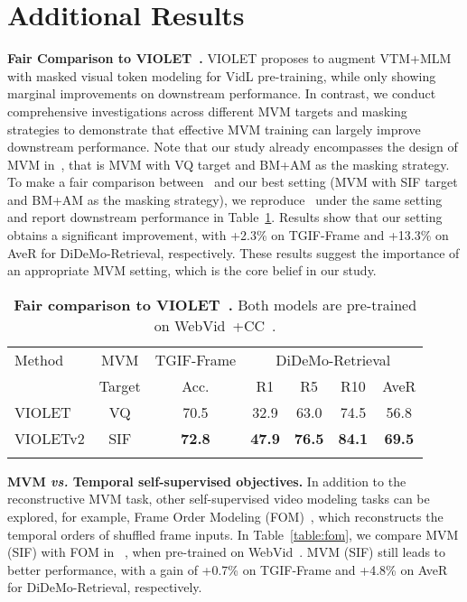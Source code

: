 \documentclass[10pt,twocolumn,letterpaper]{article}
\newlength\savewidth
\newcommand\shline{\noalign{\global\savewidth\arrayrulewidth\global\arrayrulewidth 1pt}\hline\noalign{\global\arrayrulewidth\savewidth}}
\newcommand{\tablestyle}[2]{\setlength{\tabcolsep}{#1}\renewcommand{\arraystretch}{#2}\centering\footnotesize}
\newcommand{\modelorig}{VIOLET\xspace}
\begin{document}
\section{Additional Results}
\noindent \textbf{Fair Comparison to \modelorig~\cite{fu2021violet}.} 
\modelorig proposes to augment VTM+MLM with masked visual token modeling for VidL pre-training, while only showing marginal improvements on downstream performance. In contrast, we conduct comprehensive investigations across different MVM targets and masking strategies to demonstrate that effective MVM training can largely improve downstream performance. Note that our study already encompasses the design of MVM in~\cite{fu2021violet}, that is MVM with VQ target and BM+AM as the masking strategy. To make a fair comparison between~\cite{fu2021violet} and our best setting (MVM with SIF target and BM+AM as the masking strategy), we reproduce~\cite{fu2021violet} under the same setting and report downstream performance in Table~\ref{table:violet-v1-v2}. Results show that our setting obtains a significant improvement, with +2.3\% on TGIF-Frame and +13.3\% on AveR for DiDeMo-Retrieval, respectively. These results suggest the importance of an appropriate MVM setting, which is the core belief in our study.
\vspace{-2ex}
\begin{table}[H]
\centering
    \tablestyle{5pt}{1.2} 
    \def \w{20pt} 
\begin{tabular}{lc|ccccc}
        \shline
        Method & MVM & TGIF-Frame & \multicolumn{4}{c}{DiDeMo-Retrieval} \\
        \cmidrule(lr){3-3}\cmidrule(lr){4-7}
         & Target & Acc. & R1 & R5 & R10 & AveR \\
        \hline
        VIOLET~\cite{fu2021violet} & VQ & 70.5 &  32.9 & 63.0 & 74.5 & 56.8\\
         VIOLETv2 & SIF &  \textbf{72.8} & \textbf{47.9} & \textbf{76.5} & \textbf{84.1} & \textbf{69.5}\\
        \shline
    \end{tabular}
\caption{\textbf{Fair comparison to \modelorig~\cite{fu2021violet}.} Both
models are pre-trained on WebVid~\cite{bain2021frozen}+CC~\cite{sharma2018cc}.}
    \label{table:violet-v1-v2}
\end{table} 
\vspace{0.5ex}
\noindent \textbf{MVM \textit{vs.} Temporal self-supervised objectives.} In addition to the reconstructive MVM task, other self-supervised video modeling tasks can be explored, for example, Frame Order Modeling (FOM)~\cite{li2020hero,zellers2021merlot}, which reconstructs the temporal orders of shuffled frame inputs. In Table~\ref{table:fom}, we compare MVM (SIF) with FOM in ~\cite{zellers2021merlot}, when pre-trained on WebVid~\cite{bain2021frozen}. MVM (SIF) still leads to better performance, with a gain of +0.7\% on TGIF-Frame and +4.8\% on AveR for DiDeMo-Retrieval, respectively.
\end{document}
